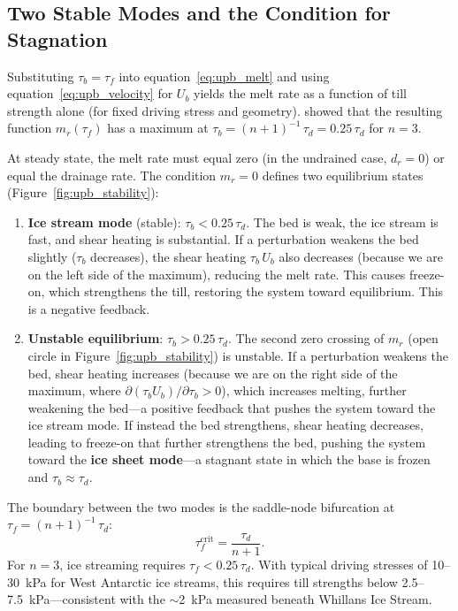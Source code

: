 \documentclass[11pt]{article}
\begin{document}
\subsection{Two Stable Modes and the Condition for Stagnation}

Substituting $\tau_b = \tau_f$ into equation~\eqref{eq:upb_melt} and using equation~\eqref{eq:upb_velocity} for $U_b$ yields the melt rate as a function of till strength alone (for fixed driving stress and geometry).  \cite{Tulaczyketal2000b} showed that the resulting function $m_r(\tau_f)$ has a maximum at $\tau_b = (n+1)^{-1}\,\tau_d = 0.25\,\tau_d$ for $n = 3$.

\medskip
\noindent At steady state, the melt rate must equal zero (in the undrained case, $d_r = 0$) or equal the drainage rate.  The condition $m_r = 0$ defines two equilibrium states (Figure~\ref{fig:upb_stability}):

\begin{enumerate}
  \item \textbf{Ice stream mode} (stable): $\tau_b < 0.25\,\tau_d$.  The bed is weak, the ice stream is fast, and shear heating is substantial.  If a perturbation weakens the bed slightly ($\tau_b$ decreases), the shear heating $\tau_b\,U_b$ also decreases (because we are on the left side of the maximum), reducing the melt rate.  This causes freeze-on, which strengthens the till, restoring the system toward equilibrium.  This is a negative feedback.

  \item \textbf{Unstable equilibrium}: $\tau_b > 0.25\,\tau_d$.  The second zero crossing of $m_r$ (open circle in Figure~\ref{fig:upb_stability}) is unstable.  If a perturbation weakens the bed, shear heating increases (because we are on the right side of the maximum, where $\partial(\tau_b U_b)/\partial \tau_b > 0$), which increases melting, further weakening the bed---a positive feedback that pushes the system toward the ice stream mode.  If instead the bed strengthens, shear heating decreases, leading to freeze-on that further strengthens the bed, pushing the system toward the \textbf{ice sheet mode}---a stagnant state in which the base is frozen and $\tau_b \approx \tau_d$.
\end{enumerate}

\noindent The boundary between the two modes is the saddle-node bifurcation at $\tau_f = (n+1)^{-1}\,\tau_d$:
\begin{equation}
  \boxed{\tau_f^{\text{crit}} = \frac{\tau_d}{n+1}.}
  \label{eq:upb_bifurcation}
\end{equation}
For $n = 3$, ice streaming requires $\tau_f < 0.25\,\tau_d$.  With typical driving stresses of 10--30~kPa for West Antarctic ice streams, this requires till strengths below 2.5--7.5~kPa---consistent with the $\sim$2~kPa measured beneath Whillans Ice Stream.
\end{document}
